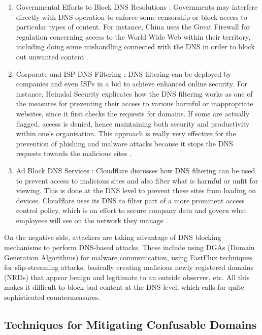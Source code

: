 \begin{enumerate}
    \item Governmental Efforts to Block DNS Resolutions : Governments may interfere directly with DNS operation to enforce some censorship or block access to particular types of content. For instance, China uses the Great Firewall for regulation concerning access to the World Wide Web within their territory, including doing some mishandling connected with the DNS in order to block out unwanted content \cite{XuAlbert2017MediaCensorship}.
    \item Corporate and ISP DNS Filtering : DNS filtering can be deployed by companies and even ISPs in a bid to achieve enhanced online security. For instance, Heimdal Security explicates how the DNS filtering works as one of the measures for preventing their access to various harmful or inappropriate websites, since it first checks the requests for domains. If some are actually flagged, access is denied, hence maintaining both security and productivity within one's organisation. This approach is really very effective for the prevention of phishing and malware attacks because it stops the DNS requests towards the malicious sites \cite{
HeimdalDNSSecurity2023}.
    \item Ad Block DNS Services : Cloudflare discusses how DNS filtering can be used to prevent access to malicious sites and also filter what is harmful or unfit for viewing. This is done at the DNS level to prevent these sites from loading on devices. Cloudflare uses its DNS to filter part of a more prominent access control policy, which is an effort to secure company data and govern what employees will see on the network they manage \cite{CloudflareDNSFiltering2023} .   
\end{enumerate}

 On the negative side, attackers are taking advantage of DNS blocking mechanisms to perform DNS-based attacks. These include using DGAs (Domain Generation Algorithms) for malware communication, using FastFlux techniques for slip-streaming attacks, basically creating malicious newly registered domains (NRDs) that appear benign and legitimate to an outside observer, etc. All this makes it difficult to block bad content at the DNS level, which calls for quite sophisticated countermeasures.


\subsection{Techniques for Mitigating Confusable Domains}

